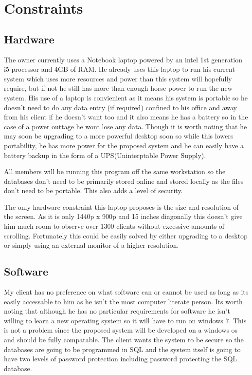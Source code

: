 \section{Constraints}

\subsection{Hardware}

The owner currently uses a Notebook laptop powered by an intel 1st generation i5 processor and 4GB of RAM. He already uses this laptop to run his current system which uses more resources and power than this system will hopefully require, but if not he still has more than enough horse power to run the new system. His use of a laptop is convienient as it means his system is portable so he doesn't need to do any data entry (if required) confined to his office and away from his client if he doesn't want too and it also means he has a battery so in the case of a power outtage he wont lose any data. Though it is worth noting that he may soon be upgrading to a more powerful desktop soon so while this lowers portability, he has more power for the proposed system and he can easily have a battery backup in the form of a UPS(Uninterptable Power Supply).

All members will be running this program off the same workstation so the databases don't need to be primarily stored online and stored locally as the files don't need to be portable. This also adds a level of security.

The only hardware constraint this laptop proposes is the size and resolution of the screen. As it is only 1440p x 900p and 15 inches diagonally this doesn't give him much room to observe over 1300 clients without excessive amounts of scrolling. Fortunately this could be easily solved by either upgrading to a desktop or simply using an external monitor of a higher resolution.

\subsection{Software}

My client has no preference on what software can or cannot be used as long as its easily accessable to him as he isn't the most computer literate person. Its worth noting that although he has no particular requirements for software he isn't willing to learn a new operating system so it will have to run on windows 7. This is not a problem since the proposed system will be developed on a windows os and should be fully compatable. The client wants the system to be secure so the databases are going to be programmed in SQL and the system itself is going to have two levels of password protection including password protecting the SQL database.

